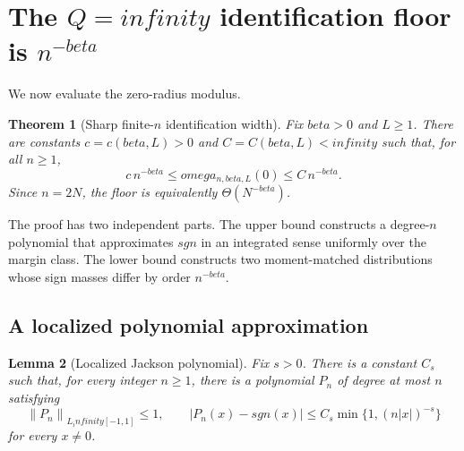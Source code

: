 \documentclass[11pt]{article}
\def\beta{beta}%
\def\omega{omega}%
\def\sgn{sgn}%
\def\infty{infinity}%
\newtheorem{theorem}{Theorem}[section]
\newtheorem{lemma}[theorem]{Lemma}
\newcommand{\sgn}{\operatorname{sgn}}
\newcommand{\norm}[1]{\left\lVert#1\right\rVert}
\begin{document}
\section{The $Q=\infty$ identification floor is $n^{-\beta}$}

We now evaluate the zero-radius modulus.

\begin{theorem}[Sharp finite-$n$ identification width]
\label{thm:identification-floor}
Fix $\beta>0$ and $L\ge1$.  There are constants
$c=c(\beta,L)>0$ and $C=C(\beta,L)<\infty$ such that, for all $n\ge1$,
\begin{equation}
\label{eq:floor}
c\,n^{-\beta}
\le
\omega_{n,\beta,L}(0)
\le
C\,n^{-\beta}.
\end{equation}
Since $n=2N$, the floor is equivalently $\Theta(N^{-\beta})$.
\end{theorem}

The proof has two independent parts.  The upper bound constructs a degree-$n$ polynomial that approximates $\sgn$ in an integrated sense uniformly over the margin class.  The lower bound constructs two moment-matched distributions whose sign masses differ by order $n^{-\beta}$.

\subsection{A localized polynomial approximation}

\begin{lemma}[Localized Jackson polynomial]
\label{lem:localized-jackson}
Fix $s>0$.  There is a constant $C_s$ such that, for every integer $n\ge1$, there is a polynomial $P_n$ of degree at most $n$ satisfying
\begin{equation}
\label{eq:jackson-bound}
\norm{P_n}_{L_\infty[-1,1]}\le1,
\qquad
|P_n(x)-\sgn(x)|
\le
C_s\min\{1,(n|x|)^{-s}\}
\end{equation}
for every $x\ne0$.
\end{lemma}
\end{document}
